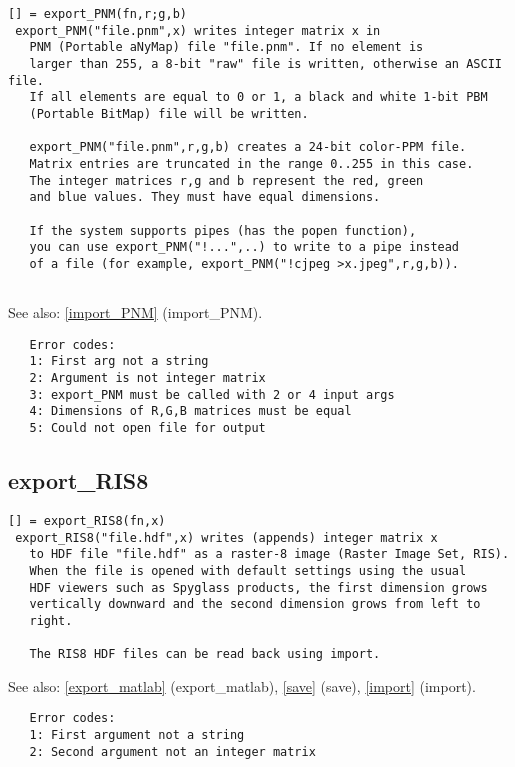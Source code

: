 \documentclass[a4paper]{article}
\begin{document}
\begin{tscreen}
\begin{verbatim}
[] = export_PNM(fn,r;g,b)
 export_PNM("file.pnm",x) writes integer matrix x in
   PNM (Portable aNyMap) file "file.pnm". If no element is
   larger than 255, a 8-bit "raw" file is written, otherwise an ASCII file.
   If all elements are equal to 0 or 1, a black and white 1-bit PBM
   (Portable BitMap) file will be written.

   export_PNM("file.pnm",r,g,b) creates a 24-bit color-PPM file.
   Matrix entries are truncated in the range 0..255 in this case.
   The integer matrices r,g and b represent the red, green
   and blue values. They must have equal dimensions.

   If the system supports pipes (has the popen function),
   you can use export_PNM("!...",..) to write to a pipe instead
   of a file (for example, export_PNM("!cjpeg >x.jpeg",r,g,b)).
   
\end{verbatim}

See also: \ref{import_PNM} {(import\_PNM)}.
\begin{verbatim}
   Error codes:
   1: First arg not a string
   2: Argument is not integer matrix
   3: export_PNM must be called with 2 or 4 input args
   4: Dimensions of R,G,B matrices must be equal
   5: Could not open file for output
\end{verbatim}
\end{tscreen}



\subsection{export\_RIS8\label{export_RIS8}}

\begin{tscreen}
\begin{verbatim}
[] = export_RIS8(fn,x)
 export_RIS8("file.hdf",x) writes (appends) integer matrix x
   to HDF file "file.hdf" as a raster-8 image (Raster Image Set, RIS).
   When the file is opened with default settings using the usual
   HDF viewers such as Spyglass products, the first dimension grows
   vertically downward and the second dimension grows from left to
   right.

   The RIS8 HDF files can be read back using import.
\end{verbatim}

See also: \ref{export_matlab} {(export\_matlab)}, \ref{save} {(save)}, \ref{import} {(import)}.
\begin{verbatim}
   Error codes:
   1: First argument not a string
   2: Second argument not an integer matrix
   
\end{verbatim}
\end{tscreen}
\end{document}
